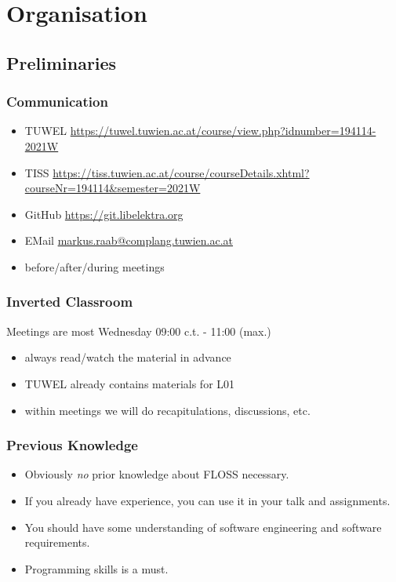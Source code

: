 \section{Organisation}

\subsection{Preliminaries}
\begin{frame}
	\frametitle{Communication}
	\begin{itemize}
		\item TUWEL \url{https://tuwel.tuwien.ac.at/course/view.php?idnumber=194114-2021W}
		\item TISS \url{https://tiss.tuwien.ac.at/course/courseDetails.xhtml?courseNr=194114&semester=2021W}
		\item GitHub \url{https://git.libelektra.org}
		\item EMail \url{markus.raab@complang.tuwien.ac.at}
		\item before/after/during meetings
	\end{itemize}
\end{frame}

\begin{frame}
	\frametitle{Inverted Classroom}
	Meetings are most Wednesday 09:00 c.t. - 11:00 (max.)

	\begin{itemize}
		\item always read/watch the material in advance
		\item TUWEL already contains materials for L01
		\item within meetings we will do recapitulations, discussions, etc.
	\end{itemize}
\end{frame}

\begin{frame}
	\frametitle{Previous Knowledge}
	\begin{itemize}
		\item Obviously \textit{no} prior knowledge about FLOSS necessary.
		\item If you already have experience, you can use it in your talk and assignments.
		\item You should have some understanding of software engineering and software requirements.
		\item Programming skills is a must.
	\end{itemize}
\end{frame}

